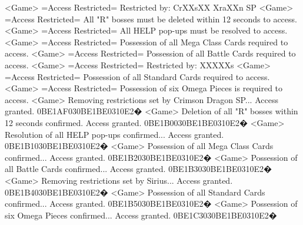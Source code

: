 <Game> =Access Restricted= Restricted by: CrXXsXX XraXXn SP 
<Game> =Access Restricted= 
All "R" bosses must be deleted within 12 seconds to access. 
<Game> =Access Restricted= All HELP pop-ups must be resolved to access. 
<Game> =Access Restricted= Possession of all Mega Class Cards required to access. 
<Game> =Access Restricted= Possession of all Battle Cards required to access. 
<Game> =Access Restricted= Restricted by: XXXXXs 
<Game> =Access Restricted= Possession of all Standard Cards required to access. 
<Game> =Access Restricted= Possession of six Omega Pieces is required to access. 
<Game> Removing restrictions set by Crimson Dragon SP... Access granted. 
{0B}{E1}{AF}{03}{0B}{E1}{BE}{03}{10}{E2}�
<Game> Deletion of all "R" bosses within 12 seconds confirmed. Access granted. 
{0B}{E1}{B0}{03}{0B}{E1}{BE}{03}{10}{E2}�
<Game> Resolution of all HELP pop-ups confirmed... Access granted. 
{0B}{E1}{B1}{03}{0B}{E1}{BE}{03}{10}{E2}�
<Game> Possession of all Mega Class Cards confirmed... Access granted. 
{0B}{E1}{B2}{03}{0B}{E1}{BE}{03}{10}{E2}�
<Game> Possession of all Battle Cards confirmed... Access granted. 
{0B}{E1}{B3}{03}{0B}{E1}{BE}{03}{10}{E2}�
<Game> Removing restrictions set by Sirius... Access granted. 
{0B}{E1}{B4}{03}{0B}{E1}{BE}{03}{10}{E2}�
<Game> Possession of all Standard Cards confirmed... Access granted. 
{0B}{E1}{B5}{03}{0B}{E1}{BE}{03}{10}{E2}�
<Game> Possession of six Omega Pieces confirmed... Access granted. 
{0B}{E1}{C3}{03}{0B}{E1}{BE}{03}{10}{E2}�
